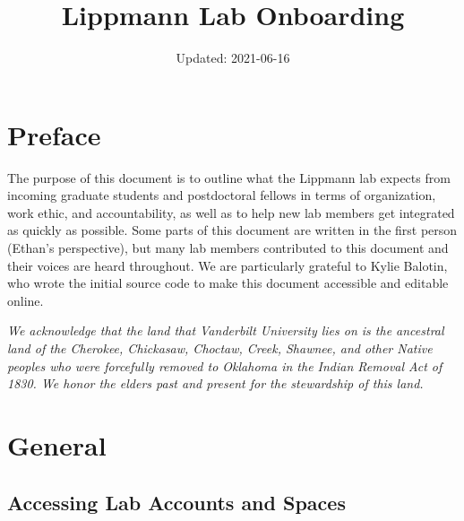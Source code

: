 \documentclass[
]{book}
\title{Lippmann Lab Onboarding}
\author{}
\date{\vspace{-2.5em}Updated: 2021-06-16}
\begin{document}
\maketitle

{
\setcounter{tocdepth}{1}
\tableofcontents
}
\hypertarget{preface}{%
\chapter*{Preface}\label{preface}}

The purpose of this document is to outline what the Lippmann lab expects from incoming graduate students and postdoctoral fellows in terms of organization, work ethic, and accountability, as well as to help new lab members get integrated as quickly as possible. Some parts of this document are written in the first person (Ethan's perspective), but many lab members contributed to this document and their voices are heard throughout. We are particularly grateful to Kylie Balotin, who wrote the initial source code to make this document accessible and editable online.

\emph{We acknowledge that the land that Vanderbilt University lies on is the ancestral land of the Cherokee, Chickasaw, Choctaw, Creek, Shawnee, and other Native peoples who were forcefully removed to Oklahoma in the Indian Removal Act of 1830. We honor the elders past and present for the stewardship of this land.}

\hypertarget{general}{%
\chapter{General}\label{general}}

\hypertarget{access}{%
\section{Accessing Lab Accounts and Spaces}\label{access}}
\end{document}
